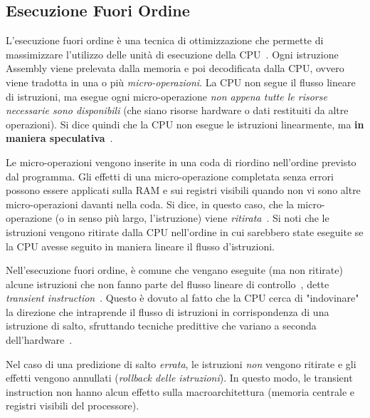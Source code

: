 \subsection{Esecuzione Fuori Ordine}
\label{sec:esecuzione-fuori-ordine}
L'esecuzione fuori ordine è una tecnica di ottimizzazione che permette di massimizzare l'utilizzo delle unità di esecuzione della CPU~\cite{lipp:meltdown}.
Ogni istruzione Assembly viene prelevata dalla memoria e poi decodificata dalla CPU, ovvero viene tradotta in una o più \emph{micro-operazioni}.
La CPU non segue il flusso lineare di istruzioni, ma esegue ogni micro-operazione \emph{non appena tutte le risorse necessarie sono disponibili} (che siano risorse hardware o dati restituiti da altre operazioni).
Si dice quindi che la CPU non esegue le istruzioni linearmente, ma \textbf{in maniera speculativa}~\cite{frosini:calcolatori2}.

Le micro-operazioni vengono inserite in una coda di riordino nell'ordine previsto dal programma.
Gli effetti di una micro-operazione completata senza errori possono essere applicati sulla RAM e sui registri visibili quando non vi sono altre micro-operazioni davanti nella coda.
Si dice, in questo caso, che la micro-operazione (o in senso più largo, l'istruzione) viene \emph{ritirata}~\cite{frosini:calcolatori2}.
Si noti che le istruzioni vengono ritirate dalla CPU nell'ordine in cui sarebbero state eseguite se la CPU avesse seguito in maniera lineare il flusso d'istruzioni.

Nell'esecuzione fuori ordine, è comune che vengano eseguite (ma non ritirate) alcune istruzioni che non fanno parte del flusso lineare di controllo~\cite{frosini:calcolatori2}, dette \emph{transient instruction}~\cite{lipp:meltdown}.
Questo è dovuto al fatto che la CPU cerca di "indovinare" la direzione che intraprende il flusso di istruzioni in corrispondenza di una istruzione di salto, sfruttando tecniche predittive che variano a seconda dell'hardware~\cite{frosini:calcolatori2}.

Nel caso di una predizione di salto \emph{errata}, le istruzioni \emph{non} vengono ritirate e gli effetti vengono annullati (\emph{rollback delle istruzioni}).
In questo modo, le transient instruction non hanno alcun effetto sulla macroarchitettura (memoria centrale e registri visibili del processore).

